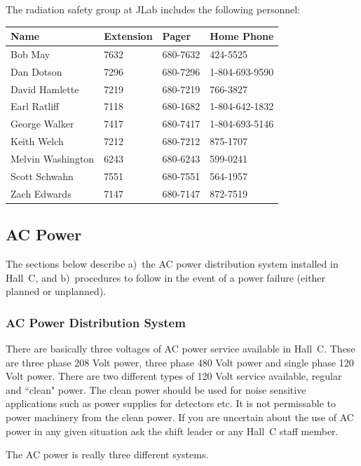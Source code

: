 The radiation safety group at JLab includes the following personnel:

\begin{center}
\begin{tabular}{llll}
\hline
Name  & Extension & Pager & Home Phone \\
\hline
Bob May & 7632 & 680-7632 & 424-5525 \\
Dan Dotson & 7296 & 680-7296 & 1-804-693-9590 \\
David Hamlette & 7219 & 680-7219 & 766-3827 \\
Earl Ratliff & 7118 & 680-1682 & 1-804-642-1832 \\
George Walker & 7417 & 680-7417 & 1-804-693-5146 \\
Keith Welch & 7212 & 680-7212 & 875-1707 \\
Melvin Washington & 6243 & 680-6243 & 599-0241 \\
Scott Schwahn & 7551 & 680-7551 & 564-1957 \\
Zach Edwards & 	7147 & 680-7147 & 872-7519 \\
\hline
\end{tabular}
\end{center}


\subsection{AC Power}

The sections below describe a)~the AC power distribution system installed
in Hall~C, and b)~procedures to follow in the event of a power failure
(either planned or unplanned).

\subsubsection{AC Power Distribution System}

There are basically three voltages of AC power service available in Hall~C.
These are three phase 208 Volt power, three phase 480 Volt power and
single phase 120 Volt power. There are two different types of 120 Volt
service available, regular and ``clean" power. The clean power
should be used for noise sensitive applications such as power supplies
for detectors etc. It is not permissable to power machinery from
the clean power. If you are uncertain about the use of AC power in any given
situation ask the shift leader or any Hall~C staff member.

The AC power is really three different systems.

